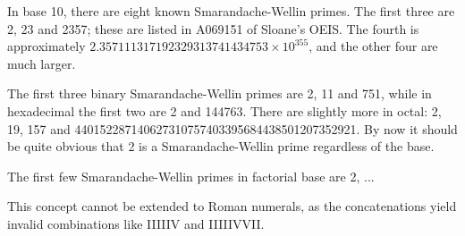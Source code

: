 \documentclass[12pt]{article}
\begin{document}
In base 10, there are eight known Smarandache-Wellin primes. The first three are 2, 23 and 2357; these are listed in A069151 of Sloane's OEIS. The fourth is approximately $2.357111317192329313741434753 \times 10^{355}$, and the other four are much larger.

The first three binary Smarandache-Wellin primes are 2, 11 and 751, while in hexadecimal the first two are 2 and 144763. There are slightly more in octal: 2, 19, 157 and 440152287140627310757403395684438501207352921. By now it should be quite obvious that 2 is a Smarandache-Wellin prime regardless of the base.

The first few Smarandache-Wellin primes in factorial base are 2, ...

This concept cannot be extended to Roman numerals, as the concatenations yield invalid combinations like IIIIIV and IIIIIVVII.
\end{document}
